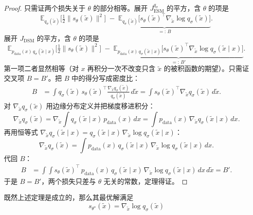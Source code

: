 \begin{proof}
只需证两个损失关于 $\theta$ 的部分相等。展开 $J_{\text{ESM}}^{q_\sigma}$ 的平方，含 $\theta$ 的项是
\begin{equation}
\mathbb{E}_{q_\sigma(\tilde x)}\Big[\tfrac12\|s_\theta(\tilde x)\|^2\Big]
\;-\; \underbrace{\mathbb{E}_{q_\sigma(\tilde x)}\big[s_\theta(\tilde x)^\top \nabla_{\tilde x}\log q_\sigma(\tilde x)\big]}_{=:\,B}.
\end{equation}
展开 $J_{\text{DSM}}$ 的平方，含 $\theta$ 的项是
\begin{equation}
\mathbb{E}_{p_{\text{data}}(x)\,q_\sigma(\tilde x\mid x)}\Big[\tfrac12\|s_\theta(\tilde x)\|^2\Big]
\;-\; \underbrace{\mathbb{E}_{p_{\text{data}}(x)\,q_\sigma(\tilde x\mid x)}\big[s_\theta(\tilde x)^\top \nabla_{\tilde x}\log q_\sigma(\tilde x\mid x)\big]}_{=:\,B'}.
\end{equation}
第一项二者显然相等（对 $x$ 再积分一次不改变只含 $\tilde x$ 的被积函数的期望）。只需证交叉项 $B = B'$。把 $B$ 中的得分写成密度比：
\begin{align}
B &= \int q_\sigma(\tilde x)\, s_\theta(\tilde x)^\top \frac{\nabla_{\tilde x} q_\sigma(\tilde x)}{q_\sigma(\tilde x)}\, d\tilde x
= \int s_\theta(\tilde x)^\top \nabla_{\tilde x} q_\sigma(\tilde x)\, d\tilde x.
\end{align}
对 $\nabla_{\tilde x} q_\sigma(\tilde x)$ 用边缘分布定义并把梯度移进积分：
\begin{equation}
\nabla_{\tilde x} q_\sigma(\tilde x)
= \nabla_{\tilde x}\!\int q_\sigma(\tilde x\mid x)\,p_{\text{data}}(x)\,dx
= \int p_{\text{data}}(x)\,\nabla_{\tilde x} q_\sigma(\tilde x\mid x)\,dx.
\end{equation}
再用恒等式 $\nabla_{\tilde x} q_\sigma(\tilde x\mid x) = q_\sigma(\tilde x\mid x)\,\nabla_{\tilde x}\log q_\sigma(\tilde x\mid x)$：
\begin{equation}
\nabla_{\tilde x} q_\sigma(\tilde x) = \int p_{\text{data}}(x)\,q_\sigma(\tilde x\mid x)\,\nabla_{\tilde x}\log q_\sigma(\tilde x\mid x)\,dx.
\end{equation}
代回 $B$：
\begin{align}
B &= \int\!\!\int s_\theta(\tilde x)^\top\, p_{\text{data}}(x)\,q_\sigma(\tilde x\mid x)\,\nabla_{\tilde x}\log q_\sigma(\tilde x\mid x)\, dx\, d\tilde x = B'.
\end{align}
于是 $B = B'$，两个损失只差与 $\theta$ 无关的常数，定理得证。
\end{proof}

既然上述定理是成立的，那么其最优解满足
\begin{equation}
s_{\theta^\star}(\tilde x) = \nabla_{\tilde x}\log q_\sigma(\tilde x)
\end{equation}

